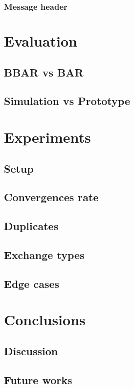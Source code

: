 \documentclass[mscthesis]{usiinfthesis}
\begin{document}
\subsection{Message header}

\chapter{Evaluation}
\section{BBAR vs BAR}
\section{Simulation vs Prototype}

\chapter{Experiments}
\section{Setup}
\section{Convergences rate}
\section{Duplicates}
\section{Exchange types}
\section{Edge cases}

\chapter{Conclusions}
\section{Discussion}
\section{Future works}
\end{document}
